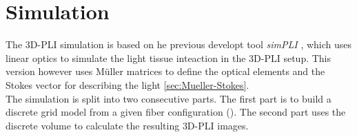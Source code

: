 \setcounter{chapter}{5}
\chapter{Simulation}
\label{cha:simulation}
% 
%
The \ac{3D-PLI} simulation is based on he previous developt tool \textit{simPLI} \cite{Dohmen2015}, which uses linear optics \cite{} to simulate the light tissue inteaction in the \ac{3D-PLI} setup.
This version however uses M\"uller matrices \cite{} to define the optical elements and the Stokes vector \cite{} for describing the light \cref{sec:Mueller-Stokes}.\\
% 
The simulation is split into two consecutive parts.
The first part is to build a discrete grid model from a given fiber configuration (\eg \dummy).
The second part uses the discrete volume to calculate the resulting \ac{3D-PLI} images.
%
%
%
